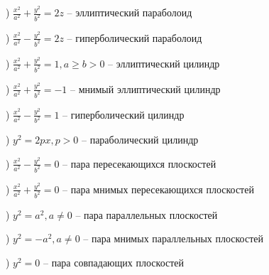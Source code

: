 ) $\frac{x^2}{a^2} + \frac{y^2}{b^2} = 2z$ -- эллиптический параболоид

) $\frac{x^2}{a^2} - \frac{y^2}{b^2} = 2z$ -- гиперболический параболоид

) $\frac{x^2}{a^2} + \frac{y^2}{b^2} = 1, a \geqslant b > 0$ -- эллиптический цилиндр

) $\frac{x^2}{a^2} + \frac{y^2}{b^2} = -1$ -- мнимый эллиптический цилиндр

) $\frac{x^2}{a^2} - \frac{y^2}{b^2} = 1$ -- гиперболический цилиндр

) $y^2 = 2px, p > 0$ -- параболический цилиндр

) $\frac{x^2}{a^2} - \frac{y^2}{b^2} = 0$ -- пара пересекающихся плоскостей

) $\frac{x^2}{a^2} + \frac{y^2}{b^2} = 0$ -- пара мнимых пересекающихся плоскостей

) $y^2 = a^2, a \neq 0$ -- пара параллельных плоскостей

) $y^2 = -a^2, a \neq 0$ -- пара мнимых параллельных плоскостей

) $y^2 = 0$ -- пара совпадающих плоскостей


